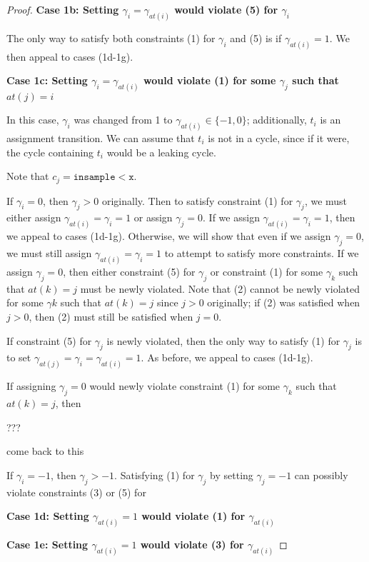 \documentclass[12pt]{article}
\newcommand{\lguard}[1][x]{\texttt{insample} < #1}
\theoremstyle{definition}
\begin{document}
\begin{proof}
    \textbf{Case 1b: Setting $\gamma_i = \gamma_{at(i)}$ would violate (5) for $\gamma_i$}
    
    The only way to satisfy both constraints (1) for $\gamma_i$ and (5) is if $\gamma_{at(i)} = 1$. We then appeal to cases (1d-1g).

    \textbf{Case 1c: Setting $\gamma_i = \gamma_{at(i)}$ would violate (1) for some $\gamma_j$ such that $at(j) = i$}

    In this case, $\gamma_i$ was changed from 1 to $\gamma_{at(i)} \in \{-1, 0\}$; additionally, $t_i$ is an assignment transition. We can assume that $t_i$ is not in a cycle, since if it were, the cycle containing $t_i$ would be a leaking cycle. 

    Note that $c_j = \lguard[\texttt{x}]$.

    If $\gamma_i = 0$, then $\gamma_{j} >0$ originally. Then to satisfy constraint (1) for $\gamma_j$, we must either assign $\gamma_{at(i)} = \gamma_i = 1$ or assign $\gamma_j = 0$. If we assign $\gamma_{at(i)} = \gamma_i =1$, then we appeal to cases (1d-1g). 
    Otherwise, we will show that even if we assign $\gamma_j=0$, we must still assign $\gamma_{at(i)} =\gamma_i=1$ to attempt to satisfy more constraints. If we assign $\gamma_j=0$, then either constraint (5) for $\gamma_j$ or constraint (1) for some $\gamma_k$ such that $at(k) = j$ must be newly violated. Note that (2) cannot be newly violated for some $\gamma k$ such that $at(k) = j$ since $j>0$ originally; if (2) was satisfied when $j>0$, then (2) must still be satisfied when $j=0$. 

    If constraint (5) for $\gamma_j$ is newly violated, then the only way to satisfy (1) for $\gamma_j$ is to set $\gamma_{at(j)} = \gamma_{i}=\gamma_{at(i)}=1$. As before, we appeal to cases (1d-1g).

    If assigning $\gamma_j=0$ would newly violate constraint (1) for some $\gamma_k$ such that $at(k) = j$, then 

    ???

    {\color{red} come back to this}


    If $\gamma_i = -1$, then $\gamma_j > -1$. Satisfying (1) for $\gamma_j$ by setting $\gamma_j = -1$ can possibly violate constraints (3) or (5) for 

    \textbf{Case 1d: Setting $\gamma_{at(i)}=1$ would violate (1) for $\gamma_{at(i)}$}

    \textbf{Case 1e: Setting $\gamma_{at(i)}=1$ would violate (3) for $\gamma_{at(i)}$}


\end{proof}
\end{document}
